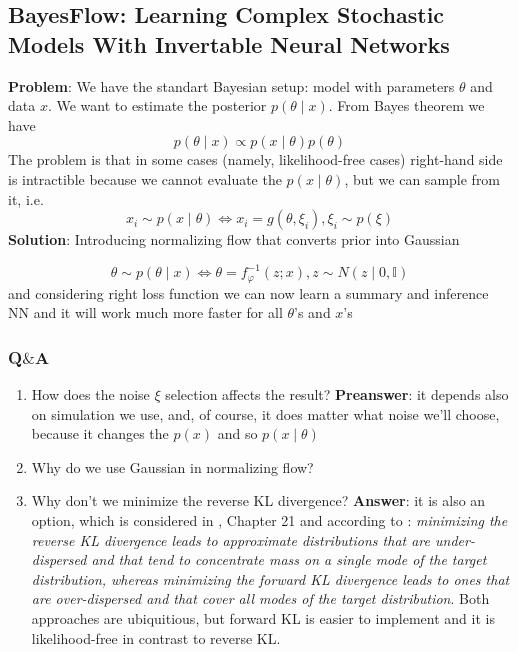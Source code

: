 \subsection{BayesFlow: Learning Complex Stochastic Models With Invertable Neural Networks \cite{radev2020bayesflowlearningcomplexstochastic}}
\textbf{Problem}: We have the standart Bayesian setup: model with parameters $\theta$ and data $x$. We want to estimate the posterior $p(\theta \mid x)$. From Bayes theorem we have
$$
p(\theta \mid x) \propto p(x \mid \theta) p(\theta)
$$
The problem is that in some cases (namely, likelihood-free cases) right-hand side is intractible because we cannot evaluate the $p(x  \mid  \theta)$, but we can sample from it, i.e.
$$
x_i \sim p(x \mid \theta) \iff x_i = g(\theta, \xi_i),  \xi_i \sim p(\xi)
$$
\textbf{Solution}: Introducing normalizing flow that converts prior into Gaussian 

$$
\theta \sim p(\theta \mid x) \iff \theta = f^{-1}_{\varphi}(z; x), z \sim N(z \mid 0, \mathbb{I})
$$
and considering right loss function we can now learn a summary and inference NN and it will work much more faster for all $\theta$'s and $x$'s
\subsubsection*{Q$\&$A}

\begin{enumerate}
    \item How does the noise $\xi$ selection affects the result? 
        \textbf{Preanswer}: it depends also on simulation we use, and, of course, 
        it does matter what noise we'll choose, because it changes the $p(x)$ and so $p(x \mid \theta)$
    \item Why do we use Gaussian in normalizing flow?
    \item Why don't we minimize the reverse KL divergence? \textbf{Answer}: it is also an option, which is 
    considered in \cite{Murphy2012MachineL}, Chapter 21 and according to \cite{zammitmangion2024neuralmethodsamortizedinference}: \guillemetleft \textit{minimizing the reverse KL divergence leads 
    to approximate distributions that are under-dispersed and that tend to concentrate mass on a single mode 
    of the target distribution, whereas minimizing the forward KL divergence leads to ones that are over-dispersed
    and that cover all modes of the target distribution}\guillemetright. 
    Both approaches are ubiquitious, but forward KL is easier to implement and it is likelihood-free in contrast to reverse KL. 
\end{enumerate}


